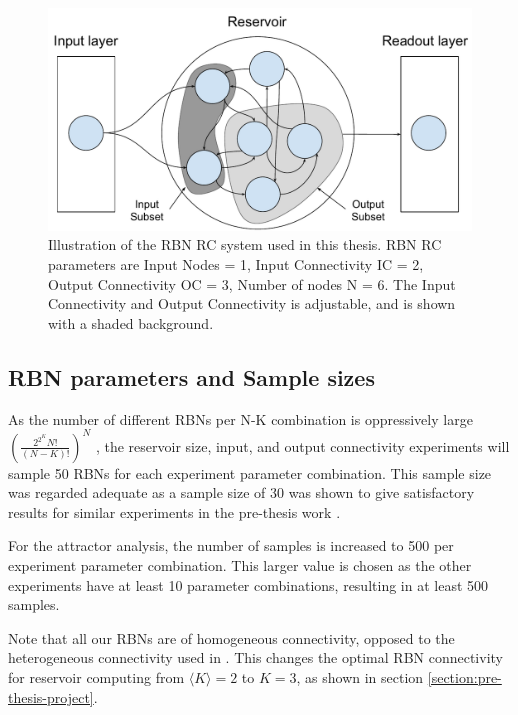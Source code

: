 \begin{figure}
    \centering
    \caption[Illustration of the RBN RC system used in this thesis]{
        Illustration of the RBN RC system used in this thesis.
        RBN RC parameters are Input Nodes = 1, Input Connectivity IC = 2, Output Connectivity OC = 3, Number of nodes N = 6.
        The Input Connectivity and Output Connectivity is adjustable,
        and is shown with a shaded background.
    }
    \label{figure:rbn-reservoir-subsets}
    \includegraphics[width=\columnwidth]{method/rbn_reservoir_subsets.pdf}
\end{figure}

\subsection{RBN parameters and Sample sizes}

As the number of different RBNs per N-K combination is oppressively large
$(\frac{2^{2^{K}}N!}{(N-K)!})^N$ \cite{gershenson2004introduction},
the reservoir size, input, and output connectivity experiments will sample 50 RBNs for each experiment parameter combination.
This sample size was regarded adequate as a sample size of 30 was shown to give satisfactory results for similar experiments in the pre-thesis work \cite{burkow2015evolving}.

For the attractor analysis, the number of samples is increased to 500 per experiment parameter combination.
This larger value is chosen as the other experiments have at least 10 parameter combinations,
resulting in at least 500 samples.

Note that all our RBNs are of homogeneous connectivity,
opposed to the heterogeneous connectivity used in \cite{rbn-reservoir}.
This changes the optimal RBN connectivity for reservoir computing from $ \langle K \rangle = 2 $ to $ K = 3$,
as shown in section \ref{section:pre-thesis-project}.


